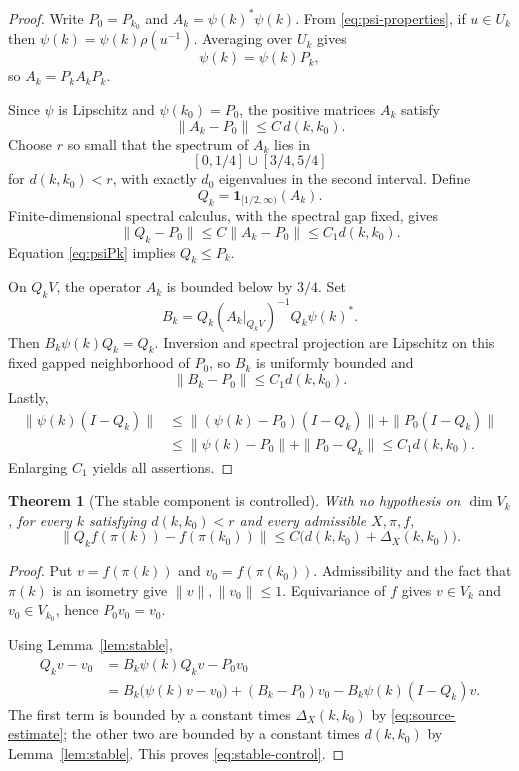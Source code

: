 \documentclass[11pt]{article}
\newtheorem{theorem}{Theorem}
\begin{document}
\begin{proof}
Write $P_0=P_{k_0}$ and $A_k=\psi(k)^*\psi(k)$.  From \eqref{eq:psi-properties}, if $u\in U_k$ then $\psi(k)=\psi(k)\rho(u^{-1})$.  Averaging over $U_k$ gives
\begin{equation}\label{eq:psiPk}
 \psi(k)=\psi(k)P_k,
\end{equation}
so $A_k=P_kA_kP_k$.

Since $\psi$ is Lipschitz and $\psi(k_0)=P_0$, the positive matrices $A_k$ satisfy
\[
 \|A_k-P_0\|\leq C\,d(k,k_0).
\]
Choose $r$ so small that the spectrum of $A_k$ lies in
\[
 [0,1/4]\cup[3/4,5/4]
\]
for $d(k,k_0)<r$, with exactly $d_0$ eigenvalues in the second interval.  Define
\[
 Q_k=\mathbf 1_{[1/2,\infty)}(A_k).
\]
Finite-dimensional spectral calculus, with the spectral gap fixed, gives
\[
 \|Q_k-P_0\|\leq C\|A_k-P_0\|
 \leq C_1d(k,k_0).
\]
Equation \eqref{eq:psiPk} implies $Q_k\leq P_k$.

On $Q_kV$, the operator $A_k$ is bounded below by $3/4$.  Set
\[
 B_k=Q_k(A_k|_{Q_kV})^{-1}Q_k\psi(k)^*.
\]
Then $B_k\psi(k)Q_k=Q_k$.  Inversion and spectral projection are Lipschitz on this fixed gapped neighborhood of $P_0$, so $B_k$ is uniformly bounded and
\[
 \|B_k-P_0\|\leq C_1d(k,k_0).
\]
Lastly,
\[
 \begin{split}
 \|\psi(k)(I-Q_k)\|
 &\leq \|(\psi(k)-P_0)(I-Q_k)\|+\|P_0(I-Q_k)\|\\
 &\leq \|\psi(k)-P_0\|+\|P_0-Q_k\|
 \leq C_1d(k,k_0).
 \end{split}
\]
Enlarging $C_1$ yields all assertions.
\end{proof}

\begin{theorem}[The stable component is controlled]\label{thm:stable-control}
With no hypothesis on $\dim V_k$, for every $k$ satisfying $d(k,k_0)<r$ and every admissible $X,\pi,f$,
\begin{equation}\label{eq:stable-control}
 \|Q_kf(\pi(k))-f(\pi(k_0))\|
 \leq C\bigl(d(k,k_0)+\Delta_X(k,k_0)\bigr).
\end{equation}
\end{theorem}

\begin{proof}
Put $v=f(\pi(k))$ and $v_0=f(\pi(k_0))$.  Admissibility and the fact that $\pi(k)$ is an isometry give $\|v\|,\|v_0\|\leq1$.  Equivariance of $f$ gives $v\in V_k$ and $v_0\in V_{k_0}$, hence $P_0v_0=v_0$.

Using Lemma~\ref{lem:stable},
\[
 \begin{split}
 Q_kv-v_0
 &=B_k\psi(k)Q_kv-P_0v_0\\
 &=B_k\bigl(\psi(k)v-v_0\bigr)
   +(B_k-P_0)v_0
   -B_k\psi(k)(I-Q_k)v.
 \end{split}
\]
The first term is bounded by a constant times $\Delta_X(k,k_0)$ by \eqref{eq:source-estimate}; the other two are bounded by a constant times $d(k,k_0)$ by Lemma~\ref{lem:stable}.  This proves \eqref{eq:stable-control}.
\end{proof}
\end{document}
